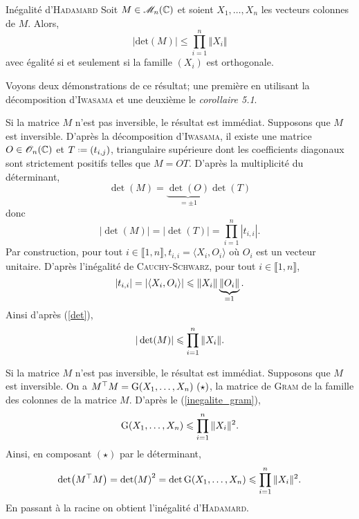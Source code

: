 
\begin{theo}{Inégalité d'\textsc{Hadamard}}
    Soit $M \in \mathscr{M}_n(\mathbb{C})$ et soient $X_1, \dots, X_n$ les vecteurs colonnes de $M$. Alors,
    $$|\mathrm{det}(M)| \leqslant \prod_{i=1}^{n} \Vert X_i \Vert$$
    avec égalité si et seulement si la famille $(X_i)$ est orthogonale.
\end{theo}

%    

Voyons deux démonstrations de ce résultat; une première en utilisant la décomposition d'\textsc{Iwasama} et une deuxième le \emph{corollaire 5.1}.

\begin{preuve}
    Si la matrice $M$ n'est pas inversible, le résultat est immédiat. Supposons que $M$ est inversible. D'après la décomposition d'\textsc{Iwasama}, il existe une matrice $O \in \mathscr{O}_n(\mathbb{C})$ et $T \defeq (t_{i,j})$, triangulaire supérieure dont les coefficients diagonaux sont strictement positifs telles que $M = OT$. D'après la multiplicité du déterminant, 
    $$\det(M) = \underbrace{\det(O)}_{= \pm 1} \det(T)$$
    donc
    \begin{equation} \label{det}
        |\det(M)| = |\det(T)| = \prod_{i=1}^{n} |t_{i,i}|.
    \end{equation}
    Par construction, pour tout $i \in \llbracket 1, n \rrbracket, t_{i,i} = \langle X_i, O_i \rangle$ où $O_i$ est un vecteur unitaire. D'après l'inégalité de \textsc{Cauchy}-\textsc{Schwarz}, pour tout $i \in \llbracket 1, n \rrbracket$, 
    $$|t_{i,i}| = |\langle X_i, O_i \rangle | \leqslant \Vert X_i \Vert \underbrace{\Vert O_i \Vert}_{=1}.$$
    Ainsi d'après (\ref{det}), 
    $$|\det(M)| \leqslant \prod_{i=1}^n \Vert X_i \Vert.$$
\end{preuve}

\begin{preuve}
    Si la matrice $M$ n'est pas inversible, le résultat est immédiat. Supposons que $M$ est inversible. On a $M^\top M = \mathrm{G}(X_1, \dots, X_n)\ (\star)$, la matrice de \textsc{Gram} de la famille des colonnes de la matrice $M$. D'après le (\ref{inegalite_gram}), 
    $$\mathrm{G}(X_1, \dots, X_n) \leqslant \prod_{i=1}^n \Vert X_i \Vert^2.$$
    Ainsi, en composant $(\star)$ par le déterminant, 
    $$\det(M^\top M) = \det(M)^2 = \det \mathrm{G}(X_1, \dots, X_n) \leqslant \prod_{i=1}^n \Vert X_i \Vert^2.$$
    En passant à la racine on obtient l'inégalité d'\textsc{Hadamard}.
\end{preuve}

